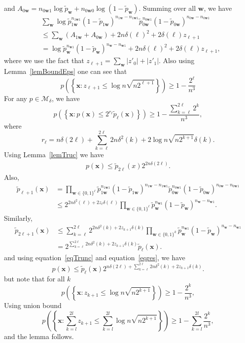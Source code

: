 \documentclass[conference,a4paper]{article}
\newcommand{\x}{\textbf{x}}
\newcommand{\w}{\textbf{w}}
\newcommand{\M}{\mathcal{M}}
\begin{document}
and $A_{0\w}=n_{0\w 1}\log\tilde{p}_{\w}+n_{0\w 0}\log(1-\tilde{p}_\w)$. Summing over all $\w$, we have
\begin{align*}
&\sum_\w\log 
\tilde{p}_{1\w}^{n_{1\w 1}}(1-\tilde{p}_{1\w})^{n_{1\w}-n_{1\w 1}}
\tilde{p}_{0\w}^{n_{0\w 1}}(1-\tilde{p}_{0\w})^{n_{0\w}-n_{0\w 1}}
\\
&\leq\sum_\w (A_{1\w}+ A_{0\w})+2n\delta(\ell)^2+2\delta(\ell)z_{\ell+1}\\
&=\log \tilde{p}_{\w}^{n_{\w 1}}(1-\tilde{p}_{\w})^{n_{\w}-n_{\w 1}}
+2n\delta(\ell)^2+2\delta(\ell)z_{\ell+1},
\end{align*}
where we use the fact that $z_{\ell+1}=\sum_\w|z'_0|+|z'_1|$.
Also using Lemma~\ref{lemBoundEps} one can see that 
\[
p\left(\left\{\x:z_{\ell+1}\le 
\log n\sqrt{n2^{\ell+1}}\right\}\right)\ge 1-\frac{2^{\ell}}{n^3}
\]
\eLemma
\bLemma
For any $p\in \M_{\delta}$, we have
$$p\left(\left\{\x:p(\x)\le 2^{r_{\ell}}\tilde{p}_{\ell}(\x)\right\}\right)\ge 1-\frac{\sum_{k=\ell}^{2\ell}2^{k}}{n^3},$$
where
$$r_{\ell}=n\delta(2\ell)+\sum_{k=\ell}^{2\ell}2n\delta^2(k)+2\log n \sqrt{n2^{k+1}}\delta(k).$$
%
\Proof
Using Lemma~\ref{lemTruc} we have
\begin{align}
\label{eqTrunc}
p(\x)\leq \tilde{p}_{2\ell}(x)
2^{2n\delta(2\ell)}.
\end{align}
Also, 
\begin{align*}
\tilde{p}_{\ell+1}(\x)
&=\prod_{\w\in\{0,1\}^\ell}   
\tilde{p}_{1\w}^{n_{1\w 1}}(1-\tilde{p}_{1\w})^{n_{1\w}-n_{1\w 1}}
\tilde{p}_{0\w}^{n_{0\w 1}}(1-\tilde{p}_{0\w})^{n_{0\w}-n_{0\w 1}}
\\
&\leq 
2^{2n\delta^2(\ell)+2z_{\ell}\delta(\ell)}\prod_{\w\in\{0,1\}^{\ell}}
\tilde{p}_{\w}^{n_{\w 1}}(1-\tilde{p}_{\w})^{n_{\w}-n_{\w 1}}.
\end{align*}
Similarly,
\begin{align}
\label{eqres}
\tilde{p}_{2\ell+1}(\x)
&\leq 
\sum_{k=\ell}^{2\ell} 2^{2n\delta^2(k)+2z_{k+1}\delta(k)}\prod_{\w\in\{0,1\}^{k}}
\tilde{p}_{\w}^{n_{\w 1}}(1-\tilde{p}_{\w})^{n_{\w}-n_{\w 1}}
\nonumber\\
&= 2^{\sum_{k=\ell}^{2\ell}2n\delta^2(k)+2z_{k+1}\delta(k)}\tilde{p}_\ell(\x).
\end{align}
and using equation~\eqref{eqTrunc} and equation~\eqref{eqres}, we have
\[
p(\x)\leq \tilde{p}_\ell(\x)2^{n\delta(2\ell)+\sum_{k=\ell}^{2\ell}2n\delta^2(k)+2z_{k+1}\delta(k)}.
\]
but note that for all $k$
\[
p\left(\left\{\x:z_{k+1}\le 
\log n\sqrt{n2^{k+1}}\right\}\right)\ge 1-\frac{2^{k}}{n^3},
\]
Using union bound
\[
p\left(\left\{\x:\sum_{k=l}^{2l}z_{k+1}\le \sum_{k=l}^{2l}
\log n\sqrt{n2^{k+1}}\right\}\right)\ge 1-\sum_{k=l}^{2l}\frac{2^{k}}{n^3},
\]
and the lemma follows. 
\end{document}
